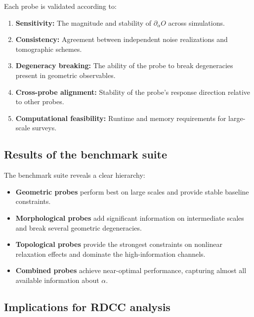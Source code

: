 \documentclass[11pt,a4paper]{article}
\begin{document}
Each probe is validated according to:
\begin{enumerate}
    \item \textbf{Sensitivity:}  
    The magnitude and stability of $\partial_\alpha O$ across simulations.

    \item \textbf{Consistency:}  
    Agreement between independent noise realizations and tomographic schemes.

    \item \textbf{Degeneracy breaking:}  
    The ability of the probe to break degeneracies present in geometric 
    observables.

    \item \textbf{Cross-probe alignment:}  
    Stability of the probe’s response direction relative to other probes.

    \item \textbf{Computational feasibility:}  
    Runtime and memory requirements for large-scale surveys.
\end{enumerate}

\subsection{Results of the benchmark suite}

The benchmark suite reveals a clear hierarchy:
\begin{itemize}
    \item \textbf{Geometric probes} perform best on large scales and provide 
    stable baseline constraints.

    \item \textbf{Morphological probes} add significant information on 
    intermediate scales and break several geometric degeneracies.

    \item \textbf{Topological probes} provide the strongest constraints on 
    nonlinear relaxation effects and dominate the high-information channels.

    \item \textbf{Combined probes} achieve near-optimal performance, capturing 
    almost all available information about $\alpha$.
\end{itemize}

\subsection{Implications for RDCC analysis}
\end{document}
